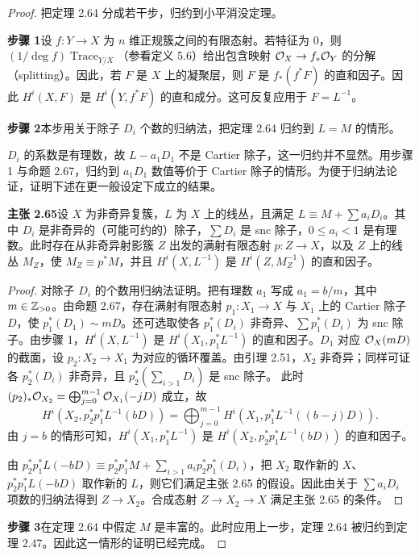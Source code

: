 \begin{proof}
把定理 2.64 分成若干步，归约到小平消没定理。

\textbf{步骤 1}\quad 设 $f:Y\to X$ 为 $n$ 维正规簇之间的有限态射。若特征为 0，则 $(1/\deg f)\operatorname{Trace}_{Y/X}$（参看定义 5.6）给出包含映射 $\mathcal{O}_X\to f_*\mathcal{O}_Y$ 的分解（splitting）。因此，若 $F$ 是 $X$ 上的凝聚层，则 $F$ 是 $f_*(f^*F)$ 的直和因子。因此 $H^i(X,F)$ 是 $H^i(Y,f^*F)$ 的直和成分。这可反复应用于 $F=L^{-1}$。

\textbf{步骤 2}\quad 本步用关于除子 $D_i$ 个数的归纳法，把定理 2.64 归约到 $L=M$ 的情形。

$D_i$ 的系数是有理数，故 $L-a_1D_1$ 不是 Cartier 除子，这一归约并不显然。用步骤 1 与命题 2.67，归约到 $a_1D_1$ 数值等价于 Cartier 除子的情形。为便于归纳法论证，证明下述在更一般设定下成立的结果。

\par\medskip\noindent\textbf{主张 2.65}\quad 设 $X$ 为非奇异复簇，$L$ 为 $X$ 上的线丛，且满足 $L\equiv M+\sum a_iD_i$。其中 $D_i$ 是非奇异的（可能可约的）除子，$\sum D_i$ 是 snc 除子，$0\le a_i<1$ 是有理数。此时存在从非奇异射影簇 $Z$ 出发的满射有限态射 $p:Z\to X$，以及 $Z$ 上的线丛 $M_Z$，使 $M_Z\equiv p^*M$，并且 $H^i(X,L^{-1})$ 是 $H^i(Z,M_Z^{-1})$ 的直和因子。

\begin{proof}
对除子 $D_i$ 的个数用归纳法证明。把有理数 $a_1$ 写成 $a_1=b/m$，其中 $m\in\mathbb{Z}_{>0}$。由命题 2.67，存在满射有限态射 $p_1:X_1\to X$ 与 $X_1$ 上的 Cartier 除子 $D$，使 $p_1^*(D_1)\sim mD$。还可选取使各 $p_1^*(D_i)$ 非奇异、$\sum p_1^*(D_i)$ 为 snc 除子。由步骤 1，$H^i(X,L^{-1})$ 是 $H^i(X_1,p_1^*L^{-1})$ 的直和因子。$D_1$ 对应 $\mathcal{O}_X(mD)$ 的截面，设 $p_2:X_2\to X_1$ 为对应的循环覆盖。由引理 2.51，$X_2$ 非奇异；同样可证各 $p_2^*(D_i)$ 非奇异，且 $p_2^*(\sum_{i>1}D_i)$ 是 snc 除子。
此时 $(p_2)_*\mathcal{O}_{X_2}=\bigoplus_{j=0}^{m-1}\mathcal{O}_{X_1}(-jD)$ 成立，故
\[
H^i(X_2,p_2^*p_1^*L^{-1}(bD))=\bigoplus_{j=0}^{m-1}H^i(X_1,p_1^*L^{-1}((b-j)D)).
\]
由 $j=b$ 的情形可知，$H^i(X_1,p_1^*L^{-1})$ 是 $H^i(X_2,p_2^*p_1^*L^{-1}(bD))$ 的直和因子。

由 $p_2^*p_1^*L(-bD)\equiv p_2^*p_1^*M+\sum_{i>1}a_ip_2^*p_1^*(D_i)$，把 $X_2$ 取作新的 $X$、$p_2^*p_1^*L(-bD)$ 取作新的 $L$，则它们满足主张 2.65 的假设。因此由关于 $\sum a_iD_i$ 项数的归纳法得到 $Z\to X_2$。合成态射 $Z\to X_2\to X$ 满足主张 2.65 的条件。
\end{proof}

\textbf{步骤 3}\quad 在定理 2.64 中假定 $M$ 是丰富的。此时应用上一步，定理 2.64 被归约到定理 2.47。因此这一情形的证明已经完成。


\end{proof}
